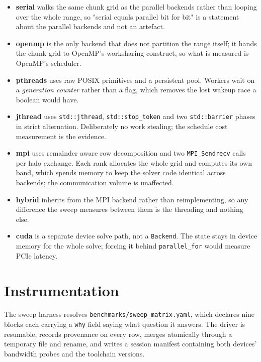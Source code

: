\documentclass[11pt,a4paper]{report}
\begin{document}
\begin{itemize}[leftmargin=*]
  \item \textbf{serial} walks the same chunk grid as the parallel backends
        rather than looping over the whole range, so "serial equals parallel bit
        for bit" is a statement about the parallel backends and not an artefact.
  \item \textbf{openmp} is the only backend that does not partition the range
        itself; it hands the chunk grid to OpenMP's worksharing construct, so
        what is measured is OpenMP's scheduler.
  \item \textbf{pthreads} uses raw POSIX primitives and a persistent pool.
        Workers wait on a \emph{generation counter} rather than a flag, which
        removes the lost wakeup race a boolean would have.
  \item \textbf{jthread} uses \texttt{std::jthread}, \texttt{std::stop\_token}
        and two \texttt{std::barrier} phases in strict alternation. Deliberately
        no work stealing; the schedule cost measurement is the evidence.
  \item \textbf{mpi} uses remainder aware row decomposition and two
        \texttt{MPI\_Sendrecv} calls per halo exchange. Each rank allocates the
        whole grid and computes its own band, which spends memory to keep the
        solver code identical across backends; the communication volume is
        unaffected.
  \item \textbf{hybrid} inherits from the MPI backend rather than
        reimplementing, so any difference the sweep measures between them is the
        threading and nothing else.
  \item \textbf{cuda} is a separate device solve path, not a \texttt{Backend}.
        The state stays in device memory for the whole solve; forcing it behind
        \texttt{parallel\_for} would measure PCIe latency.
\end{itemize}

\section{Instrumentation}

The sweep harness resolves \texttt{benchmarks/sweep\_matrix.yaml}, which declares
nine blocks each carrying a \texttt{why} field saying what question it answers.
The driver is resumable, records provenance on every row, merges atomically
through a temporary file and rename, and writes a session manifest containing
both devices' bandwidth probes and the toolchain versions.
\end{document}
